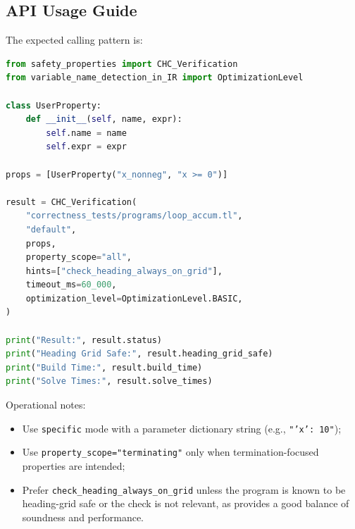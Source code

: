 \subsection*{API Usage Guide}\label{subsec:api_usage_guide}

The expected calling pattern is:

\begin{lstlisting}[style=terminal, language=python]
from safety_properties import CHC_Verification
from variable_name_detection_in_IR import OptimizationLevel

class UserProperty:
	def __init__(self, name, expr):
		self.name = name
		self.expr = expr

props = [UserProperty("x_nonneg", "x >= 0")]

result = CHC_Verification(
	"correctness_tests/programs/loop_accum.tl",
	"default",
	props,
	property_scope="all",
	hints=["check_heading_always_on_grid"],
	timeout_ms=60_000,
	optimization_level=OptimizationLevel.BASIC,
)

print("Result:", result.status)
print("Heading Grid Safe:", result.heading_grid_safe)
print("Build Time:", result.build_time)
print("Solve Times:", result.solve_times)
\end{lstlisting}

Operational notes:
\begin{itemize}[leftmargin=1.5em]
	\item Use \texttt{specific} mode with a parameter dictionary string
	(e.g., \texttt{"{'x': 10}"});
	\item Use \texttt{property\_scope="terminating"} only when termination-focused
	properties are intended;
	\item Prefer \texttt{check\_heading\_always\_on\_grid} unless the program is known to be heading-grid safe or the check is not relevant, as provides a good balance of soundness and performance.
\end{itemize}